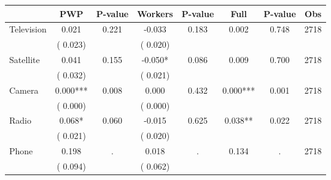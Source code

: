 
\begin{tabular}{l*{7}{c}}\hline&\multicolumn{1}{c}{PWP}&\multicolumn{1}{c}{P-value}&\multicolumn{1}{c}{Workers}&\multicolumn{1}{c}{P-value}&\multicolumn{1}{c}{Full}&\multicolumn{1}{c}{P-value}&\multicolumn{1}{c}{Obs} \\ \hline

 Television       &              0.021       &        0.221  &             -0.033       &        0.183  &              0.002       &              0.748 &  2718 \\ 
                       &       (       0.023)             &                               &       (       0.020)                     &                               &                                               &                                &                      \\ 

 Satellite       &              0.041       &        0.155  &             -0.050*       &        0.086  &              0.009       &              0.700 &  2718 \\ 
                       &       (       0.032)             &                               &       (       0.021)                     &                               &                                               &                                &                      \\ 

 Camera       &              0.000***       &        0.008  &              0.000       &        0.432  &              0.000***       &              0.001 &  2718 \\ 
                       &       (       0.000)             &                               &       (       0.000)                     &                               &                                               &                                &                      \\ 

 Radio       &              0.068*       &        0.060  &             -0.015       &        0.625  &              0.038**       &              0.022 &  2718 \\ 
                       &       (       0.021)             &                               &       (       0.020)                     &                               &                                               &                                &                      \\ 

 Phone       &              0.198       &            .  &              0.018       &            .  &              0.134       &                  . &  2718 \\ 
                       &       (       0.094)             &                               &       (       0.062)                     &                               &                                               &                                &                      \\ 

\hline \end{tabular}